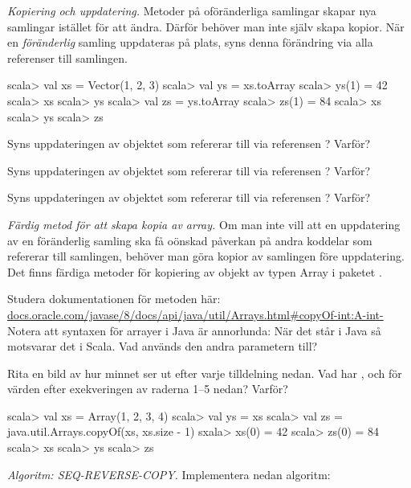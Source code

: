 \Task \emph{Kopiering och uppdatering.} Metoder på oföränderliga samlingar skapar nya samlingar istället för att ändra. Därför behöver man inte själv skapa kopior. När en \emph{föränderlig} samling uppdateras på plats, syns denna förändring via alla referenser till samlingen.

\begin{REPL}
scala> val xs = Vector(1, 2, 3)
scala> val ys = xs.toArray
scala> ys(1) = 42
scala> xs
scala> ys
scala> val zs = ys.toArray
scala> zs(1) = 84
scala> xs
scala> ys
scala> zs
\end{REPL}

\Subtask Syns uppdateringen av objektet som  refererar till via referensen ? Varför?

\Subtask Syns uppdateringen av objektet som  refererar till via referensen ? Varför?

\Subtask Syns uppdateringen av objektet som  refererar till via referensen ? Varför?

\Task \emph{Färdig metod för att skapa kopia av array.} Om man inte vill att en uppdatering av en föränderlig samling ska få oönskad påverkan på andra koddelar som refererar till samlingen, behöver man göra kopior av samlingen före uppdatering. Det finns färdiga metoder för kopiering av objekt av typen Array i paketet .

\Subtask\Pen Studera dokumentationen för metoden  här:\\ \href{https://docs.oracle.com/javase/8/docs/api/java/util/Arrays.html\#copyOf-int:A-int-}{docs.oracle.com/javase/8/docs/api/java/util/Arrays.html\#copyOf-int:A-int-} \\
Notera att syntaxen för arrayer i Java är annorlunda: När det står  i Java så motsvarar det  i Scala. Vad används den andra parametern till?

\Subtask\Pen Rita en bild av hur minnet ser ut efter varje tilldelning nedan. Vad har ,  och  för värden efter exekveringen av raderna 1--5 nedan? Varför?
\begin{REPL}
scala> val xs = Array(1, 2, 3, 4)
scala> val ys = xs
scala> val zs = java.util.Arrays.copyOf(xs, xs.size - 1)
sxala> xs(0) = 42
scala> zs(0) = 84
scala> xs
scala> ys
scala> zs
\end{REPL}

\Task \emph{Algoritm: SEQ-REVERSE-COPY.} Implementera nedan algoritm:

